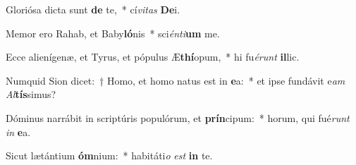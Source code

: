 \item Gloriósa dicta sunt \textbf{de} te,~* cí\textit{vi}\textit{tas} \textbf{De}i.
\item Memor ero Rahab, et Baby\textbf{ló}nis~* sci\textit{én}\textit{ti}\textbf{um} me.
\item Ecce alienígenæ, et Tyrus, et pópulus Æ\textbf{thí}opum,~* hi fu\textit{é}\textit{runt} \textbf{il}lic.
\item Numquid Sion dicet:~† Homo, et homo natus est in \textbf{e}a:~* et ipse fundávit e\textit{am} \textit{Al}\textbf{tís}simus?
\item Dóminus narrábit in scriptúris populórum, et \textbf{prín}cipum:~* horum, qui fué\textit{runt} \textit{in} \textbf{e}a.
\item Sicut lætántium \textbf{óm}nium:~* habitáti\textit{o} \textit{est} \textbf{in} te.
